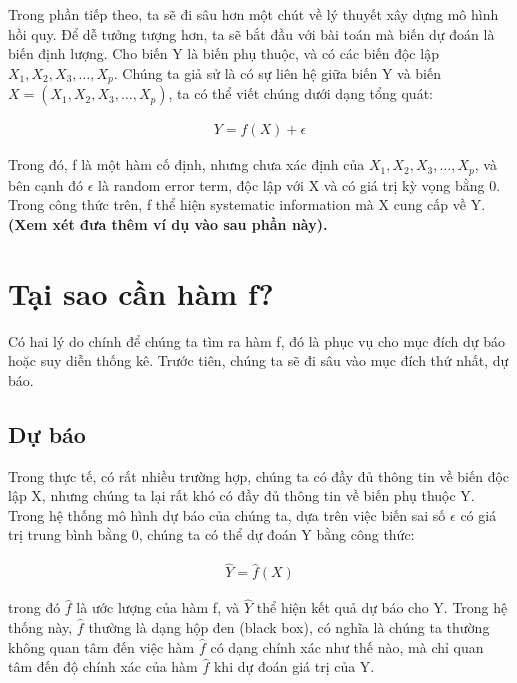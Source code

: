 \documentclass[
  12pt,
]{krantz}
\begin{document}
Trong phần tiếp theo, ta sẽ đi sâu hơn một chút về lý thuyết xây dựng mô hình hồi quy. Để dễ tưởng tượng hơn, ta sẽ bắt đầu với bài toán mà biến dự đoán là biến định lượng. Cho biến Y là biến phụ thuộc, và có các biến độc lập \(X_1,X_2,X_3,…,X_p\). Chúng ta giả sử là có sự liên hệ giữa biến Y và biến \(X = (X_1,X_2,X_3,…,X_p)\), ta có thể viết chúng dưới dạng tổng quát:

\begin{align}
Y = f(X) + \epsilon
\end{align}

Trong đó, f là một hàm cố định, nhưng chưa xác định của \(X_1,X_2,X_3,…,X_p\), và bên cạnh đó \(\epsilon\) là random error term, độc lập với X và có giá trị kỳ vọng bằng 0. Trong công thức trên, f thể hiện systematic information mà X cung cấp về Y. \textbf{(Xem xét đưa thêm ví dụ vào sau phần này).}

\hypertarget{tux1ea1i-sao-cux1ea7n-huxe0m-f}{%
\section{Tại sao cần hàm f?}\label{tux1ea1i-sao-cux1ea7n-huxe0m-f}}

Có hai lý do chính để chúng ta tìm ra hàm f, đó là phục vụ cho mục đích dự báo hoặc suy diễn thống kê. Trước tiên, chúng ta sẽ đi sâu vào mục đích thứ nhất, dự báo.

\hypertarget{dux1ef1-buxe1o}{%
\subsection{Dự báo}\label{dux1ef1-buxe1o}}

Trong thực tế, có rất nhiều trường hợp, chúng ta có đầy đủ thông tin về biến độc lập X, nhưng chúng ta lại rất khó có đầy đủ thông tin về biến phụ thuộc Y. Trong hệ thống mô hình dự báo của chúng ta, dựa trên việc biến sai số \(\epsilon\) có giá trị trung bình bằng 0, chúng ta có thể dự đoán Y bằng công thức:

\begin{align}
\hat{Y} = \hat{f}(X)
\end{align}

trong đó \(\hat{f}\) là ước lượng của hàm f, và \(\hat{Y}\) thể hiện kết quả dự báo cho Y. Trong hệ thống này, \(\hat{f}\) thường là dạng hộp đen (black box), có nghĩa là chúng ta thường không quan tâm đến việc hàm \(\hat{f}\) có dạng chính xác như thế nào, mà chỉ quan tâm đến độ chính xác của hàm \(\hat{f}\) khi dự đoán giá trị của Y.
\end{document}
